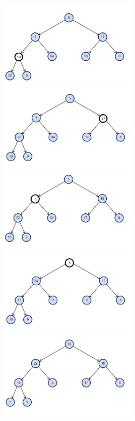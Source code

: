 \documentclass[addpoints,11pt]{exam}
\begin{document}
\begin{questions}
\begin{solutionorbox} \\ 
	\includegraphics[width=0.5\textwidth]{bmh1.jpg}
	\includegraphics[width=0.5\textwidth]{bmh2.jpg}
	\includegraphics[width=0.5\textwidth]{bmh3.jpg}
	\includegraphics[width=0.5\textwidth]{bmh4.jpg}
	\includegraphics[width=0.5\textwidth]{bmh5.jpg}
\end{solutionorbox}


\end{questions}
\end{document}
